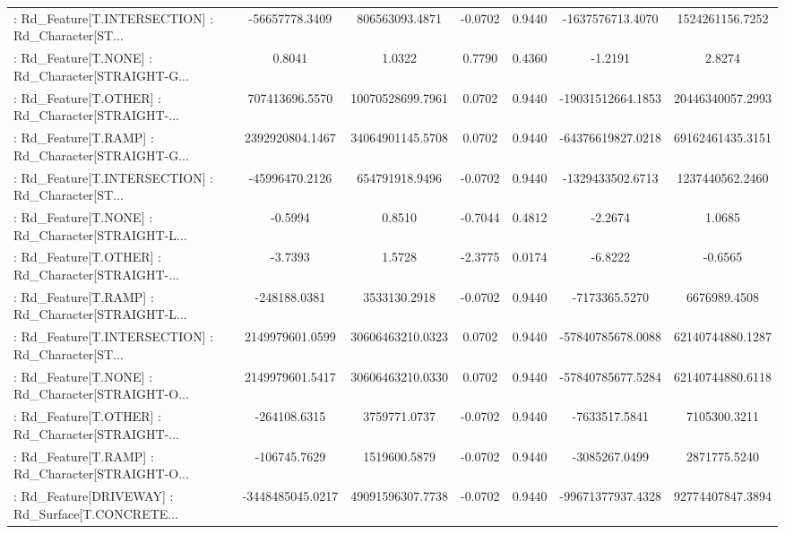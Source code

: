 \begin{longtable}{p{4cm}cccccc}
 : Rd\_Feature[T.INTERSECTION] : Rd\_Character[ST... &    -56657778.3409 &    806563093.4871 & -0.0702 &       0.9440 &   -1637576713.4070 &   1524261156.7252 \\
 : Rd\_Feature[T.NONE] : Rd\_Character[STRAIGHT-G... &            0.8041 &            1.0322 &  0.7790 &       0.4360 &            -1.2191 &            2.8274 \\
 : Rd\_Feature[T.OTHER] : Rd\_Character[STRAIGHT-... &    707413696.5570 &  10070528699.7961 &  0.0702 &       0.9440 &  -19031512664.1853 &  20446340057.2993 \\
 : Rd\_Feature[T.RAMP] : Rd\_Character[STRAIGHT-G... &   2392920804.1467 &  34064901145.5708 &  0.0702 &       0.9440 &  -64376619827.0218 &  69162461435.3151 \\
 : Rd\_Feature[T.INTERSECTION] : Rd\_Character[ST... &    -45996470.2126 &    654791918.9496 & -0.0702 &       0.9440 &   -1329433502.6713 &   1237440562.2460 \\
 : Rd\_Feature[T.NONE] : Rd\_Character[STRAIGHT-L... &           -0.5994 &            0.8510 & -0.7044 &       0.4812 &            -2.2674 &            1.0685 \\
 : Rd\_Feature[T.OTHER] : Rd\_Character[STRAIGHT-... &           -3.7393 &            1.5728 & -2.3775 &       0.0174 &            -6.8222 &           -0.6565 \\
 : Rd\_Feature[T.RAMP] : Rd\_Character[STRAIGHT-L... &      -248188.0381 &      3533130.2918 & -0.0702 &       0.9440 &      -7173365.5270 &      6676989.4508 \\
 : Rd\_Feature[T.INTERSECTION] : Rd\_Character[ST... &   2149979601.0599 &  30606463210.0323 &  0.0702 &       0.9440 &  -57840785678.0088 &  62140744880.1287 \\
 : Rd\_Feature[T.NONE] : Rd\_Character[STRAIGHT-O... &   2149979601.5417 &  30606463210.0330 &  0.0702 &       0.9440 &  -57840785677.5284 &  62140744880.6118 \\
 : Rd\_Feature[T.OTHER] : Rd\_Character[STRAIGHT-... &      -264108.6315 &      3759771.0737 & -0.0702 &       0.9440 &      -7633517.5841 &      7105300.3211 \\
 : Rd\_Feature[T.RAMP] : Rd\_Character[STRAIGHT-O... &      -106745.7629 &      1519600.5879 & -0.0702 &       0.9440 &      -3085267.0499 &      2871775.5240 \\
 : Rd\_Feature[DRIVEWAY] : Rd\_Surface[T.CONCRETE... &  -3448485045.0217 &  49091596307.7738 & -0.0702 &       0.9440 &  -99671377937.4328 &  92774407847.3894 \\

\end{longtable}
